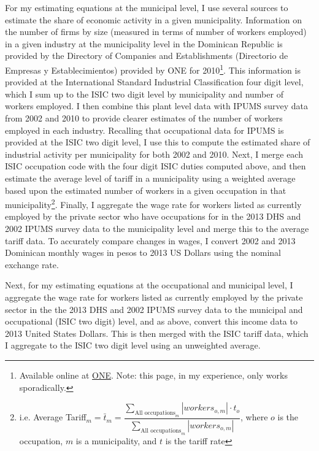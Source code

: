 \documentclass[12pt]{article}
\begin{document}
For my estimating equations at the municipal level,
I use several sources to estimate the share of economic activity in a given municipality.
Information on the number of firms by size (measured in terms of
number of workers employed) in a given industry at the 
municipality level in the Dominican Republic is provided by the 
Directory of Companies and Establishments (Directorio de Empresas y Establecimientos)
provided by 
ONE for 2010\footnote{Available online at \href{http://www.one.gov.do/recursos-automatizados/
323/directorio-de-empresas-y-establecimientos/}{ONE}. Note: this page, in my experience,
only works sporadically.}. This information is provided
at the International Standard Industrial Classification four digit level, which I sum
up to the ISIC two digit level by municipality and number of workers employed.
I then combine this plant level data with IPUMS survey data from 2002 and 2010 to provide 
clearer estimates of the number of workers employed in each industry. Recalling that occupational data
for IPUMS is provided at the ISIC two digit level, I use this to compute the estimated
share of industrial activity per municipality for both 2002 and 2010.
Next, I merge each ISIC occupation code with the four digit ISIC duties computed above, 
and then estimate the average level of tariff in a municipality using a weighted average
based upon the estimated number of workers in a given occupation in that 
municipality\footnote{i.e. Average Tariff$_m = \bar{t}_m =
\dfrac{\displaystyle \sum_{\text{All occupations}_m} |workers_{o,m}| \cdot t_o}
{\displaystyle \sum_{\text{All occupations}_m} |workers_{o,m}|}$, where $o$ is the 
occupation, $m$ is a municipality, and $t$ is the tariff rate}. Finally, I aggregate
the wage rate for workers listed as currently employed by the private sector who 
have occupations for in the 2013 DHS 
and 2002 IPUMS survey data to the municipality level and merge
this to the average tariff data. 
To accurately compare changes in wages, I convert 2002 
and 2013 Dominican monthly wages in pesos to 2013 US Dollars using the nominal exchange rate.

Next, for my estimating equations at the occupational 
and municipal level, I aggregate the wage rate for workers listed as currently employed 
by the private sector in the the 2013 DHS and 2002 IPUMS survey data to the 
municipal and occupational (ISIC two digit) level, and as above, 
convert this income data to 2013 United States Dollars. 
This is then merged with the ISIC tariff data, which I aggregate to the ISIC two digit level using
an unweighted average. 
\end{document}
